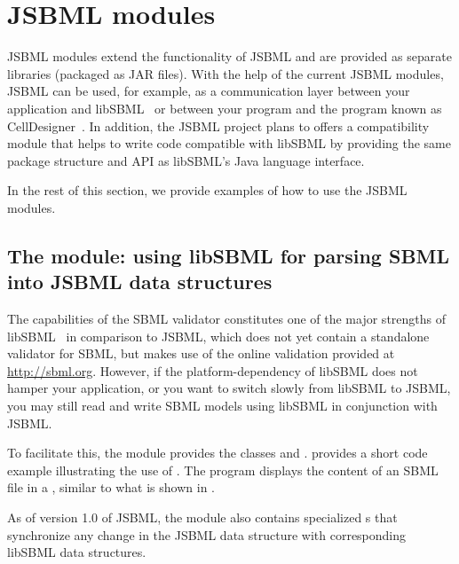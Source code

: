 
\section{JSBML modules}
\label{sec:jsbml-modules-details}

JSBML modules extend the functionality of JSBML and are provided as
separate libraries (packaged as JAR files). With the help of the current
JSBML modules, JSBML can be used, for example, as a communication layer
 between your application and
libSBML~\citep{Bornstein2008} or between your program and the program known
as CellDesigner~\citep{Funahashi2003}. In addition, the JSBML project plans to offers a
compatibility module %
that helps to write code compatible with libSBML by providing the same package 
structure and API as libSBML's Java
language interface.

In the rest of this section, we provide examples of how to use the JSBML
modules.


\subsection{The  module: using libSBML for parsing
  SBML into JSBML data structures}

The capabilities of the SBML validator constitutes one
of the major strengths of libSBML~\citep{Bornstein2008} in comparison to
JSBML, which does not yet contain a standalone validator for SBML, but makes
use of the online validation provided at \url{http://sbml.org}. However, if
the platform-dependency of libSBML does not hamper your application, or you
want to switch slowly from libSBML to JSBML, you may still read and write
SBML models using libSBML in conjunction with JSBML.

To facilitate this, the module  provides the classes
\LibSBMLReader and \LibSBMLWriter.   provides a short
code example illustrating the use of \LibSBMLReader.  The program displays the
content of an SBML file in a \JTree, similar to what is shown in
.

As of version 1.0 of JSBML, the  module also contains
specialized \TreeNodeChangeListener{}s that synchronize any change in the
JSBML data structure with corresponding libSBML data structures.

